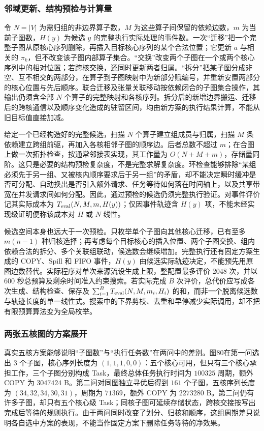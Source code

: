 \subsubsection{邻域更新、结构预检与计算量}
令 $N=|V|$ 为需归组的非边界算子数，$M$ 为这些算子间保留的依赖边数，$m$ 为当前子图数，$H(y)$ 为候选 $y$ 的完整执行实际处理的事件数。一次“迁移”把一个完整子图从原核心序列删除，再插入目标核心序列的某个合法位置；它更新 $a$ 与相关的 $\pi_k$，但不改变该子图内部算子集合。“交换”改变两个子图在一个或两个核心序列中的相对位置；若跨核交换，还同时更新两者归属。“拆分”把某子图分成非空、互不相交的两部分，在算子到子图映射中为新部分赋编号，并重新安置两部分的核心位置与先后顺序。联合迁移及张量关联移动按依赖闭合的子图集合操作，其输出仍须含全部 $N$ 个算子的完整映射和各核序列。拆分后的新增边界搬运、迁移后的跨核通信以及顺序变化造成的驻留区间，均由新方案的执行结果计算，不能从旧目标值直接加减。

给定一个已经构造好的完整候选，扫描 $N$ 个算子建立组成员与归属，扫描 $M$ 条依赖建立跨组前驱，再加入各核相邻子图的顺序边。后者总数不超过 $m$；在合图上做一次拓扑检查，按通常邻接表实现，其工作量为 $O(N+M+m)$，存储量同阶。这只是必要的结构预检复杂度，不是完整求解复杂度。环检查能够排除“某组必须先于另一组、又被核内顺序要求后于另一组”的矛盾，却不能决定瞬时缓冲是否可分配、自动换出是否引入额外请求、任务等待如何落在时间轴上，以及共享带宽在并发请求间如何分配。因此，通过预检的候选仍须完整执行验证。对事件评价记其实际成本为 $T_{\rm eval}(N,M,m,H(y))$；仅因事件轨迹含 $H(y)$ 项，不能未经实现级证明便称该成本对 $H$ 或 $N$ 线性。

候选空间本身也远大于一次预检。只枚举单个子图向其他核心迁移，已有至多 $m(n-1)$ 种归核选择；再考虑每个目标核心的插入位置、两个子图交换、组内依赖合法的拆分、多个关联组联动，候选数会继续增加。完整执行还有固定方案生成的 COPY、Spill 和 FIFO 事件，$H(y)$ 由候选实际轨迹决定，不能预先用原图边数替代。实际程序对单次来源流设生成上限，整配置最多评价 $2048$ 次，并以 $600$ 秒总预算及剩余时间准入约束搜索。若实际完成 $B$ 次评价，总代价应写成各次生成、结构检查、保存及 $\sum_{i=1}^{B}T_{\rm eval}(N,M,m_i,H_i)$ 的和，而非一个脱离候选数与轨迹长度的单一线性式。搜索中的下界剪枝、去重和早停减少实际调用，却不把有限预算算法变为全局枚举。

\subsubsection{两张五核图的方案展开}
真实五核方案能够说明“子图数”与“执行任务数”在两问中的差别。图80在第一问选出 $3$ 个子图，核心序列长度为 $(1,1,1,0,0)$：五个核心可用，但只有三个核心承担工作，三个子图分别构成 Task，最终总体任务执行时间为 $100325$ 周期，额外 COPY 为 $3047424$ B。第二问对同图独立寻优后得到 $161$ 个子图，五核序列长度为 $(34,32,34,30,31)$，周期为 $71369$，额外 COPY 为 $2273280$ B。第二问仍有许多子图，却只有五个核心级 Task；同核子图可延续存储状态，跨核交接按写出完成后等待的规则执行。由于两问同时改变了划分、归核和顺序，这组周期差只说明各自选中方案的表现，不能当作固定方案下删除任务等待的净效果。

